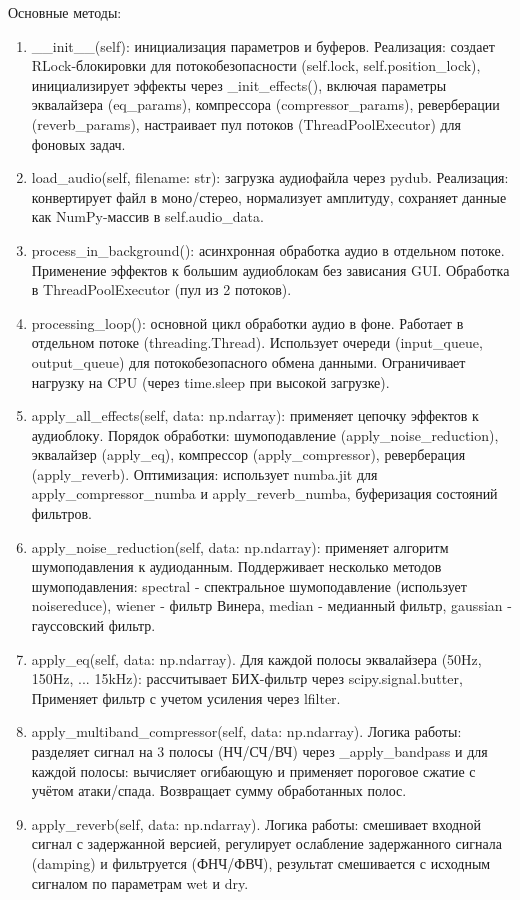 Основные методы:
\begin{enumerate}
	\item \_\_init\_\_(self): инициализация параметров и буферов. Реализация: создает RLock-блокировки для потокобезопасности (self.lock, self.position\_lock), инициализирует эффекты через \_init\_effects(), включая параметры эквалайзера (eq\_params), компрессора (compressor\_params), реверберации (reverb\_params), настраивает пул потоков (ThreadPoolExecutor) для фоновых задач.
	\item load\_audio(self, filename: str): загрузка аудиофайла через pydub. Реализация: конвертирует файл в моно/стерео, нормализует амплитуду, сохраняет данные как NumPy-массив в self.audio\_data.
	\item process\_in\_background(): асинхронная обработка аудио в отдельном потоке. Применение эффектов к большим аудиоблокам без зависания GUI. Обработка в ThreadPoolExecutor (пул из 2 потоков).
	\item processing\_loop(): основной цикл обработки аудио в фоне. Работает в отдельном потоке (threading.Thread). Использует очереди (input\_queue, output\_queue) для потокобезопасного обмена данными. Ограничивает нагрузку на CPU (через time.sleep при высокой загрузке).
	\item apply\_all\_effects(self, data: np.ndarray): применяет цепочку эффектов к аудиоблоку. Порядок обработки: шумоподавление (apply\_noise\_reduction), эквалайзер (apply\_eq), компрессор (apply\_compressor), реверберация (apply\_reverb). Оптимизация: использует numba.jit для apply\_compressor\_numba и apply\_reverb\_numba, буферизация состояний фильтров.
	\item apply\_noise\_reduction(self, data: np.ndarray): применяет алгоритм шумоподавления к аудиоданным. Поддерживает несколько методов шумоподавления: spectral - спектральное шумоподавление (использует noisereduce), wiener - фильтр Винера, median - медианный фильтр, gaussian - гауссовский фильтр.
	\item apply\_eq(self, data: np.ndarray). Для каждой полосы эквалайзера (50Hz, 150Hz, ... 15kHz): рассчитывает БИХ-фильтр через scipy.signal.butter, Применяет фильтр с учетом усиления через lfilter.
	\item apply\_multiband\_compressor(self, data: np.ndarray). Логика работы: разделяет сигнал на 3 полосы (НЧ/СЧ/ВЧ) через \_apply\_bandpass и для каждой полосы: вычисляет огибающую и применяет пороговое сжатие с учётом атаки/спада. Возвращает сумму обработанных полос.
	\item apply\_reverb(self, data: np.ndarray). Логика работы: смешивает входной сигнал с задержанной версией, регулирует ослабление задержанного сигнала (damping) и фильтруется (ФНЧ/ФВЧ), результат смешивается с исходным сигналом по параметрам wet и dry.
\end{enumerate}

